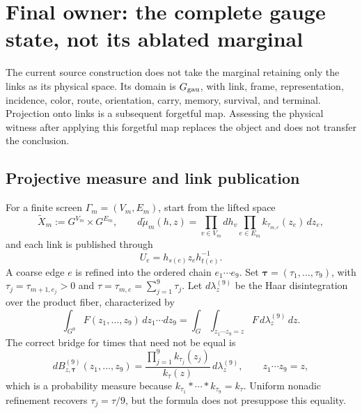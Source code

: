 \section{Final owner: the complete gauge state, not its ablated marginal}

The current source construction does not take the marginal retaining only
the links as its physical space. Its domain is $\mathfrak G_{\rm gau}$, with link, frame,
representation, incidence, color, route, orientation,
carry, memory, survival, and terminal. Projection onto links is a subsequent
forgetful map. Assessing the physical witness after applying this forgetful map replaces the
object and does not transfer the conclusion.

\subsection{Projective measure and link publication}

For a finite screen $\Gamma_m=(V_m,E_m)$, start from the lifted space
\begin{equation}\label{eq:pdf2-ym-owner-lifted-space}
 \widetilde X_m:=G^{V_m}\times G^{E_m},\qquad
 d\widetilde\mu_m(h,z)
 =\prod_{v\in V_m}dh_v\prod_{e\in E_m}k_{\tau_{m,e}}(z_e)\,dz_e,
\end{equation}
and each link is published through
\begin{equation}\label{eq:pdf2-ym-owner-link-publication}
 U_e=h_{s(e)}z_eh_{t(e)}^{-1}.
\end{equation}
A coarse edge $e$ is refined into the ordered chain
$e_1\cdots e_9$. Set
\(\boldsymbol\tau=(\tau_1,\ldots,\tau_9)\), with
\(\tau_j=\tau_{m+1,e_j}>0\) and
\(\tau=\tau_{m,e}=\sum_{j=1}^9\tau_j\). Let
\(d\lambda_z^{(9)}\) be the Haar disintegration over the product fiber,
characterized by
\[
 \int_{G^9}F(z_1,\ldots,z_9)\,dz_1\cdots dz_9
 =\int_G\int_{z_1\cdots z_9=z}
   F\,d\lambda_z^{(9)}\,dz.
\]
The correct bridge for times that need not be equal is
\begin{equation}\label{eq:pdf2-ym-owner-heat-bridge}
 dB_{z,\boldsymbol\tau}^{(9)}(z_1,\ldots,z_9)
 =\frac{\prod_{j=1}^9k_{\tau_j}(z_j)}{k_\tau(z)}
   \,d\lambda_z^{(9)},
 \qquad z_1\cdots z_9=z,
\end{equation}
which is a probability measure because
\(k_{\tau_1}*\cdots*k_{\tau_9}=k_\tau\). Uniform nonadic refinement
recovers \(\tau_j=\tau/9\), but the formula does not presuppose this equality.

